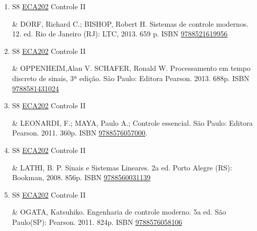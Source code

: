 \documentclass[12pt,a4paper]{book}
\begin{document}
\begin{enumerate}
&   CHIAVENATO, Idalberto.  Empreendedorismo: dando asas ao espírito empreendedor.  3ª Edição.  Saraiva, 2008.  ISBN \href{http://www.bn.br/site/pages/servicosProfissionais/agenciaISBN/isbnBusca/FbnBuscaISBNCatalogo.asp?pField=ISBN&pIntPagina=1&pISBN=20432778&nidbISBN=true&hidbISBN=true}{9788520432778}.
 \item S8 \hyperref[PUD:ECA202]{ECA202} Controle II

&  DORF, Richard C.;  BISHOP, Robert H.  Sistemas de controle modernos.  12. ed.  Rio de Janeiro (RJ): LTC, 2013.  659 p.  ISBN \href{http://www.bn.br/site/pages/servicosProfissionais/agenciaISBN/isbnBusca/FbnBuscaISBNCatalogo.asp?pField=ISBN&pIntPagina=1&pISBN=21619956&nidbISBN=true&hidbISBN=true}{9788521619956}

 

 \item S8 \hyperref[PUD:ECA202]{ECA202} Controle II

&   OPPENHEIM,Alan V.  SCHAFER, Ronald W.  Processamento em tempo discreto de sinais, 3ª edição.  São Paulo: Editora Pearson.  2013.  688p.  ISBN \href{http://www.bn.br/site/pages/servicosProfissionais/agenciaISBN/isbnBusca/FbnBuscaISBNCatalogo.asp?pField=ISBN&pIntPagina=1&pISBN=81431024&nidbISBN=true&hidbISBN=true}{9788581431024}

 

 \item S8 \hyperref[PUD:ECA202]{ECA202} Controle II

&   LEONARDI, F.;  MAYA, Paulo A.;  Controle essencial.  São Paulo: Editora Pearson.  2011.  360p.  ISBN \href{http://www.bn.br/site/pages/servicosProfissionais/agenciaISBN/isbnBusca/FbnBuscaISBNCatalogo.asp?pField=ISBN&pIntPagina=1&pISBN=76057000&nidbISBN=true&hidbISBN=true}{9788576057000}.
 \item S8 \hyperref[PUD:ECA202]{ECA202} Controle II

&  LATHI, B.  P.  Sinais e Sistemas Lineares.  2a ed.  Porto Alegre (RS): Bookman, 2008.  856p.  ISBN \href{http://www.bn.br/site/pages/servicosProfissionais/agenciaISBN/isbnBusca/FbnBuscaISBNCatalogo.asp?pField=ISBN&pIntPagina=1&pISBN=60031139&nidbISBN=true&hidbISBN=true}{9788560031139}

 

 \item S8 \hyperref[PUD:ECA202]{ECA202} Controle II

&  OGATA, Katsuhiko.  Engenharia de controle moderno.  5a ed.  São Paulo(SP): Pearson.  2011.  824p.  ISBN \href{http://www.bn.br/site/pages/servicosProfissionais/agenciaISBN/isbnBusca/FbnBuscaISBNCatalogo.asp?pField=ISBN&pIntPagina=1&pISBN=76058106&nidbISBN=true&hidbISBN=true}{9788576058106} 


\end{enumerate}
\end{document}
